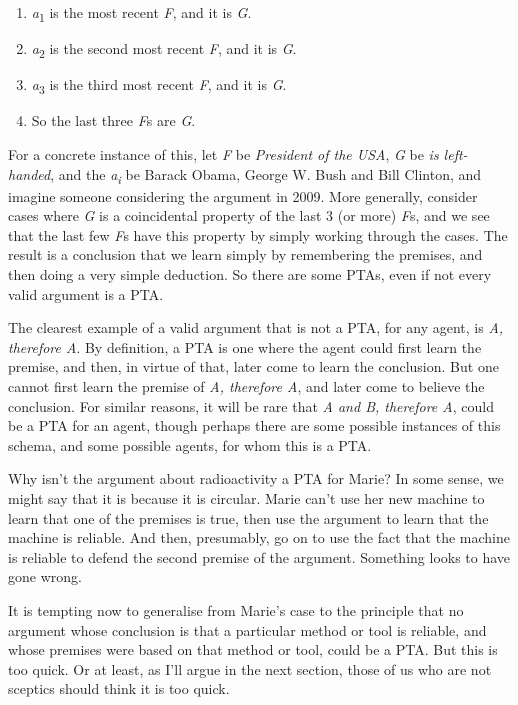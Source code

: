 \documentclass[
  10pt,
  letterpaper,
  twoside]{scrbook}
\providecommand{\tightlist}{%
  \setlength{\itemsep}{0pt}\setlength{\parskip}{0pt}}\usepackage{longtable,booktabs,array}
\begin{document}
\begin{enumerate}
\def\labelenumi{\arabic{enumi}.}
\tightlist
\item
  \emph{a}\textsubscript{1} is the most recent \emph{F}, and it is
  \emph{G}.
\item
  \emph{a}\textsubscript{2} is the second most recent \emph{F}, and it
  is \emph{G}.
\item
  \emph{a}\textsubscript{3} is the third most recent \emph{F}, and it is
  \emph{G}.
\item
  So the last three \emph{F}s are \emph{G}.
\end{enumerate}

For a concrete instance of this, let \emph{F} be \emph{President of the
USA}, \emph{G} be \emph{is left-handed}, and the
\emph{a\textsubscript{i}} be Barack Obama, George W. Bush and Bill
Clinton, and imagine someone considering the argument in 2009. More
generally, consider cases where \emph{G} is a coincidental property of
the last 3 (or more) \emph{F}s, and we see that the last few \emph{F}s
have this property by simply working through the cases. The result is a
conclusion that we learn simply by remembering the premises, and then
doing a very simple deduction. So there are some PTAs, even if not every
valid argument is a PTA.

The clearest example of a valid argument that is not a PTA, for any
agent, is \emph{A, therefore A}. By definition, a PTA is one where the
agent could first learn the premise, and then, in virtue of that, later
come to learn the conclusion. But one cannot first learn the premise of
\emph{A, therefore A}, and later come to believe the conclusion. For
similar reasons, it will be rare that \emph{A and B, therefore A}, could
be a PTA for an agent, though perhaps there are some possible instances
of this schema, and some possible agents, for whom this is a PTA.

Why isn't the argument about radioactivity a PTA for {Marie}? In some
sense, we might say that it is because it is circular. {Marie} can't use
her new machine to learn that one of the premises is true, then use the
argument to learn that the machine is reliable. And then, presumably, go
on to use the fact that the machine is reliable to defend the second
premise of the argument. Something looks to have gone wrong.

It is tempting now to generalise from {Marie}'s case to the principle
that no argument whose conclusion is that a particular method or tool is
reliable, and whose premises were based on that method or tool, could be
a PTA. But this is too quick. Or at least, as I'll argue in the next
section, those of us who are not sceptics should think it is too quick.
\end{document}
